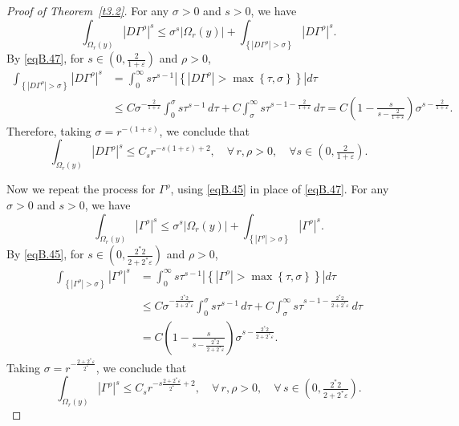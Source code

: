\documentclass[12pt,reqno]{amsart}
\theoremstyle{plain}
\theoremstyle{definition}
\newenvironment{pf}
{\begin{proof}} {\end{proof}}
\newcommand{\eps}{\varepsilon}
\newcommand{\Ga}{\Gamma}
\newcommand{\Om}{\Omega}
\newcommand{\si}{\sigma}
\newcommand{\abs}[1]{\left\vert#1\right\vert}
\newcommand{\set}[1]{\left\{#1\right\}}
\newcommand{\pr}[1]{\left( #1 \right) }
\begin{document}
\begin{appendix}
\begin{pf}[Proof of Theorem~\ref{t3.2}]
For any $\si> 0$ and $s > 0$, we have
\begin{equation*}
\int_{\Om_r(y)} \abs{D\Ga^\rho}^s 
\le \si^s \abs{\Om_r(y)} + \int_{\set{\abs{D\Ga^\rho}>\si}} \abs{D \Ga^\rho}^s.
\end{equation*}
By \eqref{eqB.47}, for $s \in \pr{0,\frac{2}{1+\eps}}$ and $\rho > 0$, 
\begin{align*}
\int_{\set{|D\Ga^\rho|>\si}} \abs{D\Ga^\rho}^s 
&= \int_0^\infty s \tau^{s-1} \abs{\set{\abs{D\Ga^\rho}>\max\set{\tau,\si}}} d\tau \\
&\le C \si^{-\frac{2}{1+\eps}} \int_0^\si s \tau^{s-1} \, d \tau
+ C\int_\si^\infty s \tau^{s-1 -\frac{2}{1+\eps}} \, d\tau
= C \pr{1-\frac{s}{s-\frac{2}{1+\eps}}} \si^{s-\frac{2}{1+\eps}}.
\end{align*}
Therefore, taking $\si=r^{-\pr{1+\eps}}$, we conclude that
\begin{equation}
\label{eqB.48}
 \int_{\Om_r(y)} \abs{D\Ga^\rho}^s 
 \le C_s r^{-s\pr{1+\eps}+2}, \quad \forall \, r, \rho > 0, \quad \forall s\in \pr{0, \tfrac{2}{1+\eps}}.
\end{equation}

Now we repeat the process for $\Ga^\rho$, using \eqref{eqB.45} in place of \eqref{eqB.47}.
For any $\si> 0$ and $s > 0$, we have
\begin{equation*}
\int_{\Om_r(y)} \abs{\Ga^\rho}^s 
\le \si^s \abs{\Om_r(y)} + \int_{\set{\abs{\Ga^\rho}>\si}} \abs{\Ga^\rho}^s.
\end{equation*}
By \eqref{eqB.45}, for $s \in \pr{0, \frac{2^* 2}{2 + 2^* \eps}}$ and $\rho > 0$, 
\begin{align*}
\int_{\set{|\Ga^\rho|>\si}} \abs{\Ga^\rho}^s 
&= \int_0^\infty s \tau^{s-1} \abs{\set{\abs{\Ga^\rho}>\max\set{\tau,\si}}} d\tau \\
&\le C \si^{-\frac{2^* 2}{2 + 2^* \eps}} \int_0^\si s \tau^{s-1} \, d \tau
+ C\int_\si^\infty s \tau^{s-1 - \frac{2^* 2}{2 + 2^* \eps}} \, d\tau \\
&= C \pr{1-\frac{s}{s-\frac{2^* 2}{2 + 2^* \eps}}} \si^{s - \frac{2^* 2}{2 + 2^* \eps}}.
\end{align*}
Taking $\si=r^{-\frac{2 + 2^* \eps}{2^*}}$, we conclude that
\begin{equation}
\label{eqB.49}
 \int_{\Om_r(y)} \abs{\Ga^\rho}^s
 \le C_s r^{-s\frac{2 + 2^* \eps}{2^*}+2}, \quad \forall \, r, \rho > 0, \quad \forall \, s \in \pr{0, \tfrac{2^* 2}{2 + 2^* \eps}}.
\end{equation}


\end{pf}
\end{appendix}
\end{document}
